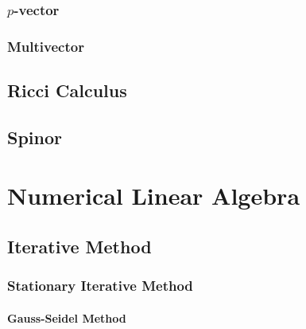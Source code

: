 \subsubsection{$p$-vector}\label{sec:p_vector}

\subsubsection{Multivector}\label{sec:multivector}



\subsection{Ricci Calculus}\label{sec:ricci_calculus}

\subsection{Spinor}\label{sec:spinor}



\section{Numerical Linear Algebra}\label{sec:numerical_linear_algebra}

\subsection{Iterative Method}\label{sec:iterative_method}

\subsubsection{Stationary Iterative Method}
\label{sec:stationary_iterative}

\paragraph{Gauss-Seidel Method}\label{sec:gauss_seidel}\hfill

